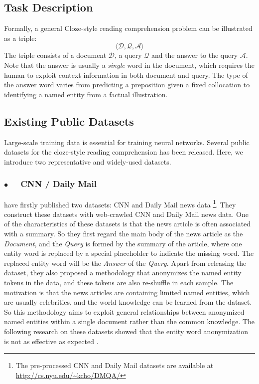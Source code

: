 \documentclass[11pt,a4paper]{article}
\begin{document}
\subsection{Task Description}
Formally, a general Cloze-style reading comprehension problem can be illustrated as a triple:
\begin{equation}
\nonumber \langle \mathcal D, \mathcal Q, \mathcal A \rangle
\end{equation}
The triple consists of a document  $\mathcal D$, a query $\mathcal Q$ and the answer to the query $\mathcal A$. 
Note that the answer is usually a {\em single} word in the document, which requires the human to exploit context information in both document and query.
The type of the answer word varies from predicting a preposition given a fixed collocation to identifying a named entity from a factual illustration.

\subsection{Existing Public Datasets}
Large-scale training data is essential for training neural networks.
Several public datasets for the cloze-style reading comprehension has been released. 
Here, we introduce two representative and widely-used datasets.

\subsubsection*{$\bullet$~~ CNN / Daily Mail}
 have firstly published two datasets: CNN and Daily Mail news data \footnote{The pre-processed CNN and Daily Mail datasets are available at \url{http://cs.nyu.edu/~kcho/DMQA/}}.
They construct these datasets with web-crawled CNN and Daily Mail news data. 
One of the characteristics of these datasets is that the news article is often associated with a summary. 
So they first regard the main body of the news article as the {\em Document}, and the {\em Query} is formed by the summary of the article, where one entity word is replaced by a special placeholder to indicate the missing word. 
The replaced entity word will be the {\em Answer} of the {\em Query}.  
Apart from releasing the dataset, they also proposed a methodology that anonymizes the named entity tokens in the data, and these tokens are also re-shuffle in each sample. The motivation is that the news articles are containing limited named entities, which are usually celebrities, and the world knowledge can be learned from the dataset. So this methodology aims to exploit general relationships between anonymized named entities within a single document rather than the common knowledge.
The following research on these datasets showed that the entity word anonymization is not as effective as expected \citep{chen-etal-2016}.
\end{document}
